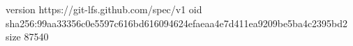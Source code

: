 version https://git-lfs.github.com/spec/v1
oid sha256:99aa33356c0e5597c616bd616094624efaeaa4e7d411ea9209be5ba4c2395bd2
size 87540

